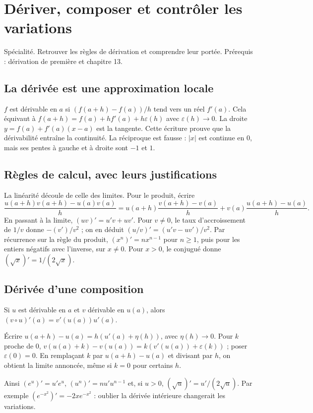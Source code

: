 \documentclass[../cours_tle.tex]{subfiles}
\begin{document}
\setcounter{chapter}{13}
\chapter{Dériver, composer et contrôler les variations}
\label{ch:14}
\begin{objectif}
Spécialité. Retrouver les règles de dérivation et comprendre leur portée. Prérequis : dérivation de première et chapitre 13.
\end{objectif}
\section{La dérivée est une approximation locale}
$f$ est dérivable en $a$ si $(f(a+h)-f(a))/h$ tend vers un réel $f'(a)$.
Cela équivaut à
$f(a+h)=f(a)+hf'(a)+h\varepsilon(h)$ avec $\varepsilon(h)\to0$.
La droite $y=f(a)+f'(a)(x-a)$ est la tangente.
Cette écriture prouve que la dérivabilité entraîne la continuité. La réciproque est fausse : $|x|$ est continue en $0$, mais ses pentes à gauche et à droite sont $-1$ et $1$.
\section{Règles de calcul, avec leurs justifications}
La linéarité découle de celle des limites. Pour le produit, écrire
\[
\frac{u(a+h)v(a+h)-u(a)v(a)}h
=u(a+h)\frac{v(a+h)-v(a)}h+v(a)\frac{u(a+h)-u(a)}h.
\]
En passant à la limite, $(uv)'=u'v+uv'$. Pour $v\ne0$, le taux d'accroissement de $1/v$ donne $-(v')/v^2$ ; on en déduit $(u/v)'=(u'v-uv')/v^2$.
Par récurrence sur la règle du produit, $(x^n)'=nx^{n-1}$ pour $n\ge1$, puis pour les entiers négatifs avec l'inverse, sur $x\ne0$.
Pour $x>0$, le conjugué donne $(\sqrt x)'=1/(2\sqrt x)$.
\section{Dérivée d'une composition}
\begin{theoreme}
Si $u$ est dérivable en $a$ et $v$ dérivable en $u(a)$, alors
$(v\circ u)'(a)=v'(u(a))u'(a)$.
\end{theoreme}
\begin{demonstration}
Écrire $u(a+h)-u(a)=h(u'(a)+\eta(h))$, avec $\eta(h)\to0$.
Pour $k$ proche de $0$, $v(u(a)+k)-v(u(a))=k(v'(u(a))+\varepsilon(k))$ ; poser $\varepsilon(0)=0$.
En remplaçant $k$ par $u(a+h)-u(a)$ et divisant par $h$, on obtient la limite annoncée, même si $k=0$ pour certains $h$.
\end{demonstration}
Ainsi $(e^{u})'=u'e^u$, $(u^n)'=nu'u^{n-1}$ et, si $u>0$, $(\sqrt u)'=u'/(2\sqrt u)$.
Par exemple $(e^{-x^2})'=-2xe^{-x^2}$ : oublier la dérivée intérieure changerait les variations.
\end{document}
